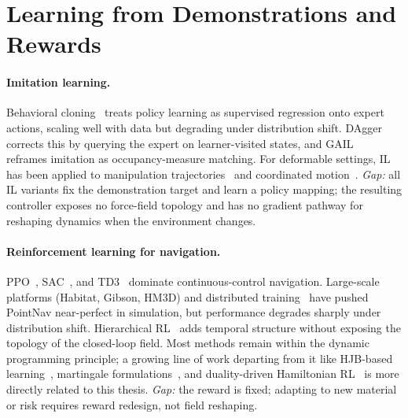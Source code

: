 \section{Learning from Demonstrations and Rewards}
\label{sec:rw:demonstrations}

\paragraph{Imitation learning.}
Behavioral cloning~\citep{torabi2018behavioralcloningobservation} treats policy learning as
supervised regression onto expert actions, scaling well with data but
degrading under distribution shift.
DAgger~\citep{shi2025dagger} corrects this by querying the expert
on learner-visited states, and GAIL~\citep{ho2016generativeadversarialimitationlearning} reframes
imitation as occupancy-measure matching.
For deformable settings, IL has been applied to manipulation
trajectories~\citep{zhang2024adaptigraph} and coordinated
motion~\citep{Lai_2025}.
\emph{Gap:} all IL variants fix the demonstration target and learn a
policy mapping; the resulting controller exposes no force-field
topology and has no gradient pathway for reshaping dynamics when
the environment changes.

\paragraph{Reinforcement learning for navigation.}
PPO~\citep{schulman2017proximalpolicyoptimizationalgorithms}, SAC~\citep{haarnoja2018softactorcriticoffpolicymaximum,mohammad2025sac},
and TD3~\citep{fujimoto2018addressingfunctionapproximationerror} dominate continuous-control navigation.
Large-scale platforms (Habitat, Gibson, HM3D) and distributed
training~\citep{wijmans2019dd} have pushed PointNav near-perfect in
simulation, but performance degrades sharply under distribution shift.
Hierarchical RL~\citep{vezhnevets2017feudalnetworkshierarchicalreinforcement} adds temporal
structure without exposing the topology of the closed-loop field.
Most methods remain within the dynamic programming principle; a
growing line of work departing from it like HJB-based
learning~\citep{settai2025temporal}, martingale
formulations~\citep{jia2023qlearning}, and duality-driven Hamiltonian
RL~\citep{nguyen2024dpo} is more directly related to this thesis.
\emph{Gap:} the reward is fixed; adapting to new material or risk
requires reward redesign, not field reshaping.

